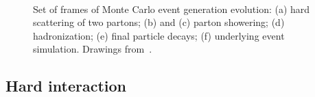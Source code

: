 \begin{figure}[tbph]
\begin{center}
	\\
	\caption{Set of frames of Monte Carlo event generation evolution: (a) hard scattering of two
        partons; (b) and (c) parton showering; (d) hadronization; (e) final particle decays; (f)
        underlying event simulation. Drawings from~\cite{Gieseke}.\label{fig:eventevolution}}%
\end{center}\end{figure}



\subsection{Hard interaction}\label{sec:matrixelement}

